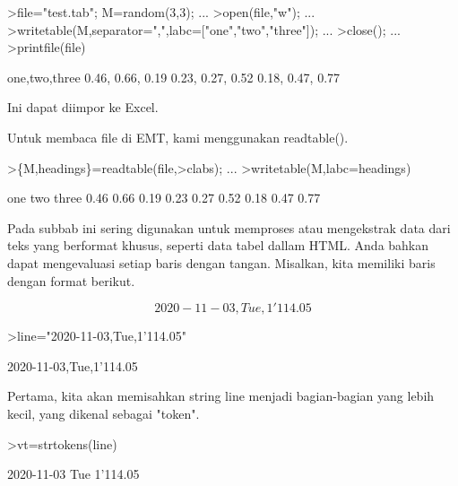 \documentclass{article}
\begin{document}
\begin{eulernotebook}
\begin{eulercomment}
\begin{eulercomment}
\begin{eulercomment}
\begin{eulercomment}
\begin{eulercomment}
\begin{eulercomment}
\begin{eulercomment}
\begin{eulercomment}
\begin{eulercomment}
\begin{eulercomment}
\begin{eulercomment}
\begin{eulercomment}
\begin{eulercomment}
\begin{eulercomment}
\begin{eulerprompt}
>file="test.tab"; M=random(3,3);  ...
>open(file,"w");  ...
>writetable(M,separator=",",labc=["one","two","three"]);  ...
>close(); ...
>printfile(file)
\end{eulerprompt}
\begin{euleroutput}
  one,two,three
        0.46,      0.66,      0.19
        0.23,      0.27,      0.52
        0.18,      0.47,      0.77
\end{euleroutput}
\begin{eulercomment}
Ini dapat diimpor ke Excel.

Untuk membaca file di EMT, kami menggunakan readtable().
\end{eulercomment}
\begin{eulerprompt}
>\{M,headings\}=readtable(file,>clabs); ...
>writetable(M,labc=headings)
\end{eulerprompt}
\begin{euleroutput}
         one       two     three
        0.46      0.66      0.19
        0.23      0.27      0.52
        0.18      0.47      0.77
\end{euleroutput}
\begin{eulercomment}
Pada subbab ini sering digunakan untuk memproses atau mengekstrak data
dari teks yang berformat khusus, seperti data tabel dallam HTML. Anda
bahkan dapat mengevaluasi setiap baris dengan tangan. Misalkan, kita
memiliki baris dengan format berikut.\\
\end{eulercomment}
\begin{eulerformula}
\[
2020-11-03, Tue, 1'114.05
\]
\end{eulerformula}
\begin{eulerprompt}
>line="2020-11-03,Tue,1'114.05"
\end{eulerprompt}
\begin{euleroutput}
  2020-11-03,Tue,1'114.05
\end{euleroutput}
\begin{eulercomment}
Pertama, kita akan memisahkan string line menjadi bagian-bagian yang
lebih kecil, yang dikenal sebagai "token".
\end{eulercomment}
\begin{eulerprompt}
>vt=strtokens(line)
\end{eulerprompt}
\begin{euleroutput}
  2020-11-03
  Tue
  1'114.05
\end{euleroutput}

\end{eulercomment}
\end{eulercomment}
\end{eulercomment}
\end{eulercomment}
\end{eulercomment}
\end{eulercomment}
\end{eulercomment}
\end{eulercomment}
\end{eulercomment}
\end{eulercomment}
\end{eulercomment}
\end{eulercomment}
\end{eulercomment}
\end{eulercomment}
\end{eulernotebook}
\end{document}
